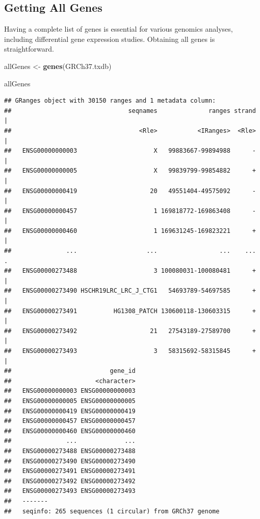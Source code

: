 \documentclass[
]{book}
\newenvironment{Shaded}{\begin{snugshade}}{\end{snugshade}}
\newcommand{\FunctionTok}[1]{\textcolor[rgb]{0.13,0.29,0.53}{\textbf{#1}}}
\newcommand{\NormalTok}[1]{#1}
\newcommand{\OtherTok}[1]{\textcolor[rgb]{0.56,0.35,0.01}{#1}}
\begin{document}
\hypertarget{getting-all-genes}{%
\subsection{Getting All Genes}\label{getting-all-genes}}

Having a complete list of genes is essential for various genomics analyses, including differential gene expression studies. Obtaining all genes is straightforward.

\begin{Shaded}
\begin{Highlighting}[]
\NormalTok{allGenes }\OtherTok{\textless{}{-}} \FunctionTok{genes}\NormalTok{(GRCh37.txdb)}

\NormalTok{allGenes}
\end{Highlighting}
\end{Shaded}

\begin{verbatim}
## GRanges object with 30150 ranges and 1 metadata column:
##                                seqnames              ranges strand |
##                                   <Rle>           <IRanges>  <Rle> |
##   ENSG00000000003                     X   99883667-99894988      - |
##   ENSG00000000005                     X   99839799-99854882      + |
##   ENSG00000000419                    20   49551404-49575092      - |
##   ENSG00000000457                     1 169818772-169863408      - |
##   ENSG00000000460                     1 169631245-169823221      + |
##               ...                   ...                 ...    ... .
##   ENSG00000273488                     3 100080031-100080481      + |
##   ENSG00000273490 HSCHR19LRC_LRC_J_CTG1   54693789-54697585      + |
##   ENSG00000273491          HG1308_PATCH 130600118-130603315      + |
##   ENSG00000273492                    21   27543189-27589700      + |
##   ENSG00000273493                     3   58315692-58315845      + |
##                           gene_id
##                       <character>
##   ENSG00000000003 ENSG00000000003
##   ENSG00000000005 ENSG00000000005
##   ENSG00000000419 ENSG00000000419
##   ENSG00000000457 ENSG00000000457
##   ENSG00000000460 ENSG00000000460
##               ...             ...
##   ENSG00000273488 ENSG00000273488
##   ENSG00000273490 ENSG00000273490
##   ENSG00000273491 ENSG00000273491
##   ENSG00000273492 ENSG00000273492
##   ENSG00000273493 ENSG00000273493
##   -------
##   seqinfo: 265 sequences (1 circular) from GRCh37 genome
\end{verbatim}
\end{document}
